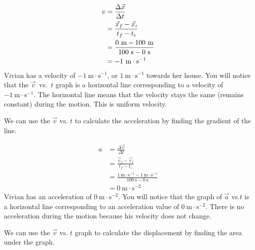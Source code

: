     \begin{align*}
    v &= \frac{\Delta \vec{x}}{\Delta t}\hfill \\ 
      &= \frac{\vec{x}_{f}-\vec{x}_{i}}{{t}_{f}-{t}_{i}}\\ 
      &= \frac{0~\text{m}-100~\text{m}}{100~\text{s}-0~\text{s}}\hfill \\ 
      &= -1~\text{m}\ensuremath{\cdot}{\text{s}}^{-1}
      \end{align*}
        \label{m38795*id70472}Vivian has a velocity of $-1~\text{m}\ensuremath{\cdot}\text{s}{}^{-1}$, or $1~\text{m}\ensuremath{\cdot}\text{s}{}^{-1}$ towards her house. You will notice that the $\vec{v}$~vs.~$t$ graph is a horizontal line corresponding to a velocity of $-1~\text{m}\ensuremath{\cdot}\text{s}{}^{-1}$. The horizontal line means that the velocity stays the same (remains constant) during the motion. This is uniform velocity.\par 
        \label{m38795*id70573}We can use the $\vec{v}$ vs. $t$ to calculate the acceleration by finding the gradient of the line.\par 
        \label{m38795*id70595}\nopagebreak\noindent{}
          
    \begin{align*}
      a&= \frac{\Delta \vec{v}}{\Delta t}\\ 
      &= \frac{\vec{v}_{f}-\vec{v}_{i}}{{t}_{f}-{t}_{i}}\\ 
      &= \frac{1~\text{m}\ensuremath{\cdot}{\text{s}}^{-1}-1~\text{m}\ensuremath{\cdot}{\text{s}}^{-1}}{100~\text{s}-0~\text{s}}\\ 
      &= 0~\text{m}\ensuremath{\cdot}{\text{s}}^{-2}
      \end{align*}
        \label{m38795*id70807}Vivian has an acceleration of $0~\text{m}\ensuremath{\cdot}\text{s}{}^{-2}$. You will notice that the graph of $\vec{a}$ vs.$t$ is a horizontal line corresponding to an acceleration value of $0~\text{m}\ensuremath{\cdot}\text{s}{}^{-2}$. There is no acceleration during the motion because his velocity does not change.\par 
        \label{m38795*id70880}We can use the $\vec{v}$ vs. $t$ graph to calculate the displacement by finding the area under the graph.\par 
        \label{m38795*id70902}\nopagebreak\noindent{}
          
